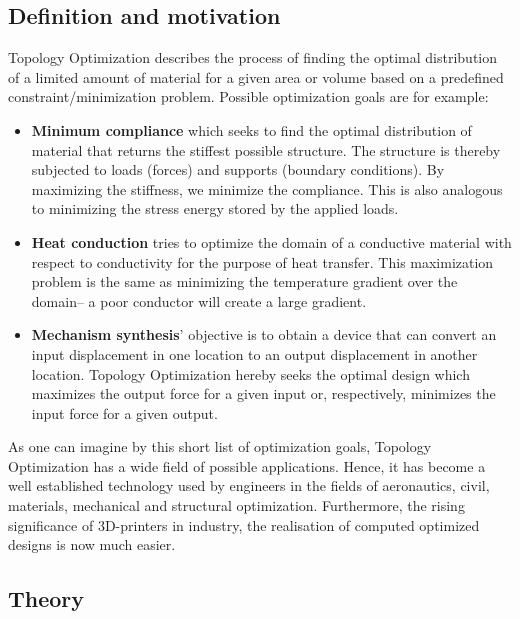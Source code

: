\label{sec:TopOpt}
\subsection{Definition and motivation}
Topology Optimization describes the process of finding the optimal distribution of a limited amount of material for a given area or volume based on a predefined constraint/minimization problem. Possible optimization goals are for example:
\begin{itemize}
\item \textbf{Minimum compliance} which seeks to find the optimal distribution of material that returns the stiffest possible structure. The structure is thereby subjected to loads (forces) and supports (boundary conditions). By maximizing the stiffness, we minimize the compliance. This is also analogous to minimizing the stress energy stored by the applied loads.
\item \textbf{Heat conduction} tries to optimize the domain of a conductive material with respect to conductivity for the purpose of heat transfer. This maximization problem is the same as minimizing the temperature gradient over the domain-- a poor conductor will create a large gradient.
\item \textbf{Mechanism synthesis}' objective is to obtain a device that can convert an input displacement in one location to an output displacement in another location. Topology Optimization hereby seeks the optimal design which maximizes the output force for a given input or, respectively, minimizes the input force for a given output.
\end{itemize}


As one can imagine by this short list of optimization goals, Topology Optimization has a wide field of possible applications. Hence, it has become a well established technology used by engineers in the fields of aeronautics, civil, materials, mechanical and structural optimization. Furthermore, the rising significance of 3D-printers in industry, the realisation of computed optimized designs is now much easier.

\subsection{Theory}
